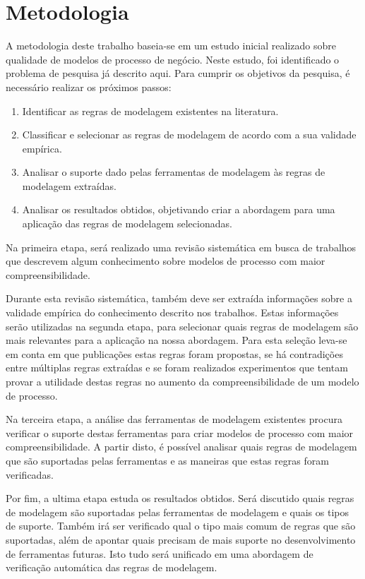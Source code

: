 \documentclass[12pt]{article}
\begin{document}
\section{Metodologia}

A metodologia deste trabalho baseia-se em um estudo inicial realizado sobre qualidade de modelos de processo de negócio. Neste estudo, foi identificado o problema de pesquisa já descrito aqui. Para cumprir os objetivos da pesquisa, é necessário realizar os próximos passos:
\begin{enumerate}
	\item Identificar as regras de modelagem existentes na literatura.
	\item Classificar e selecionar as regras de modelagem de acordo com a sua validade empírica.
	\item Analisar o suporte dado pelas ferramentas de modelagem às regras de modelagem extraídas.
	\item Analisar os resultados obtidos, objetivando criar a abordagem para uma aplicação das regras de modelagem selecionadas. 
\end{enumerate}

Na primeira etapa, será realizado uma revisão sistemática em busca de trabalhos que descrevem algum conhecimento sobre modelos de processo com maior compreensibilidade. 

Durante esta revisão sistemática, também deve ser extraída informações sobre a validade empírica do conhecimento descrito nos trabalhos. Estas informações serão utilizadas na segunda etapa, para selecionar quais regras de modelagem são mais relevantes para a aplicação na nossa abordagem. Para esta seleção leva-se em conta em que publicações estas regras foram propostas, se há contradições entre múltiplas regras extraídas e se foram realizados experimentos que tentam provar a utilidade destas regras no aumento da compreensibilidade de um modelo de processo.

Na terceira etapa, a análise das ferramentas de modelagem existentes procura verificar o suporte destas ferramentas para criar modelos de processo com maior compreensibilidade. A partir disto, é possível analisar quais regras de modelagem que são suportadas pelas ferramentas e as maneiras que estas regras foram verificadas.

Por fim, a ultima etapa estuda os resultados obtidos. Será discutido quais regras de modelagem são suportadas pelas ferramentas de modelagem e quais os tipos de suporte. Também irá ser verificado qual o tipo mais comum de regras que são suportadas, além de apontar quais precisam de mais suporte no desenvolvimento de ferramentas futuras. Isto tudo será unificado em uma abordagem de verificação automática das regras de modelagem.
\end{document}
